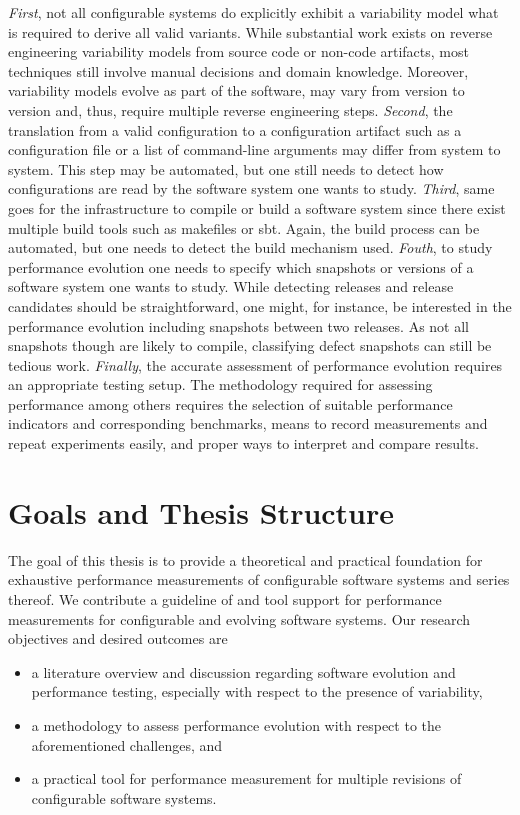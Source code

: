 \emph{First}, not all configurable systems do explicitly exhibit a variability
model what is required to derive all valid variants. While substantial work exists on
reverse engineering variability models from source code or non-code artifacts,
most techniques still involve manual decisions and domain knowledge. Moreover,
variability models evolve as part of the software,  may vary from version to
version and, thus, require multiple reverse engineering steps.
\emph{Second}, the translation from a valid configuration to a configuration
artifact such as a configuration file or a list of command-line arguments may differ
from system to system. This step may be automated, but one still needs to
detect how configurations are read by the software system one wants to study.
\emph{Third}, same goes for the infrastructure to compile or build a software
system since there exist multiple build tools such as makefiles or sbt. Again, the
build process can be automated, but one needs to detect the build mechanism
used.
\emph{Fouth}, to study performance evolution one needs to specify which
snapshots or versions of a software system one wants to study. While detecting
releases and release candidates should be straightforward, one might, for
instance, be interested in the performance evolution including snapshots
between two releases. As not all snapshots though are likely to compile,
classifying defect snapshots can still be tedious work.
\emph{Finally}, the accurate assessment of performance evolution requires an
appropriate testing setup. The methodology required for assessing performance
among others requires the selection of suitable performance indicators and
corresponding benchmarks, means to record measurements and repeat experiments
easily, and proper ways to interpret and compare results.

\section{Goals and Thesis Structure}

The goal of this thesis is to provide a theoretical and practical foundation for
exhaustive performance measurements of configurable software systems and series
thereof. We contribute a guideline of and tool support for performance
measurements for configurable and evolving software systems. Our research
objectives and desired outcomes are

\begin{itemize}
\item a literature overview and discussion regarding software evolution and
performance testing, especially with respect to the presence of variability,
\item a methodology to assess performance evolution with respect to the
aforementioned challenges, and
\item a practical tool for performance measurement for multiple revisions of
configurable software systems.
\end{itemize}

